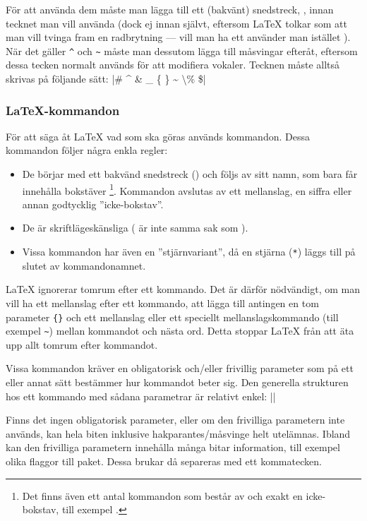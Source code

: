 \documentclass[../../latex.tex]{subfiles}
\begin{document}
För att använda dem måste man lägga till ett (bakvänt) snedstreck,
\cmd{}, innan tecknet man vill använda (dock ej innan
\cmd{} självt, eftersom \LaTeX{} tolkar
\cmd{\textbackslash} som att man vill tvinga fram en
radbrytning — vill man ha ett \cmd{} använder man istället
).
När det gäller \verb|^| och \verb|~| måste man
dessutom lägga till måsvingar efteråt, eftersom dessa tecken normalt används för att
modifiera vokaler. Tecknen måste alltså skrivas på följande sätt:
\latex|\# \^{} \& \_ \{ \} \~{} \textbackslash \% \$|

\subsubsection{\LaTeX-kommandon}
För att säga åt \LaTeX{} vad som ska göras används kommandon. Dessa
kommandon följer några enkla regler:
\begin{itemize}
	\item De börjar med ett bakvänd snedstreck (\cmd{}) och följs av sitt
	namn, som bara får innehålla bokstäver%
	\footnote{Det finns även ett antal kommandon som består av \cmd{} och
	exakt en icke-bokstav, till exempel \cmd{\&}.}.
	Kommandon avslutas av ett
	mellanslag, en siffra eller annan godtycklig ”icke-bokstav”.
	
	\item De är skriftlägeskänsliga ( är inte samma sak som
	).
	
	\item Vissa kommandon har även en ”stjärnvariant”, då en stjärna
	(\texttt{*}) läggs till på slutet av kommandonamnet.
\end{itemize}

\LaTeX{} ignorerar tomrum efter ett kommando. Det är därför nödvändigt, om
man vill ha ett mellanslag efter ett kommando, att lägga till antingen en
tom parameter \texttt{\{\}} och ett mellanslag eller ett speciellt
mellanslagskommando (till exempel \texttt{\~{}}) mellan
kommandot och nästa ord. Detta stoppar \LaTeX{} från att äta upp allt
tomrum efter kommandot.

Vissa kommandon kräver en obligatorisk och/eller frivillig parameter som
på ett eller annat sätt bestämmer hur kommandot beter sig. Den generella
strukturen hos ett kommando med sådana parametrar är relativt enkel:
\latex||

Finns det ingen obligatorisk parameter, eller om den frivilliga parametern
inte används, kan hela biten inklusive hakparantes/måsvinge helt
utelämnas. Ibland kan den frivilliga parametern innehålla många bitar
information, till exempel olika flaggor till paket. Dessa brukar då
separeras med ett kommatecken.
\end{document}

